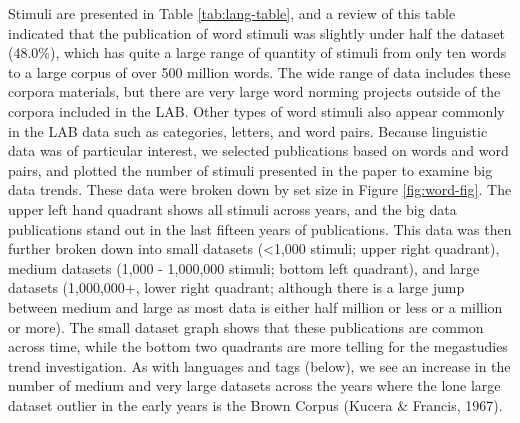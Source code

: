 \documentclass[english,man]{apa6}
\theoremstyle{definition}
\theoremstyle{definition}
\theoremstyle{definition}
\theoremstyle{remark}
\begin{document}
Stimuli are presented in Table \ref{tab:lang-table}, and a review of
this table indicated that the publication of word stimuli was slightly
under half the dataset (48.0\%), which has quite a large range of
quantity of stimuli from only ten words to a large corpus of over 500
million words. The wide range of data includes these corpora materials,
but there are very large word norming projects outside of the corpora
included in the LAB. Other types of word stimuli also appear commonly in
the LAB data such as categories, letters, and word pairs. Because
linguistic data was of particular interest, we selected publications
based on words and word pairs, and plotted the number of stimuli
presented in the paper to examine big data trends. These data were
broken down by set size in Figure \ref{fig:word-fig}. The upper left
hand quadrant shows all stimuli across years, and the big data
publications stand out in the last fifteen years of publications. This
data was then further broken down into small datasets (\textless{}1,000
stimuli; upper right quadrant), medium datasets (1,000 - 1,000,000
stimuli; bottom left quadrant), and large datasets (1,000,000+, lower
right quadrant; although there is a large jump between medium and large
as most data is either half million or less or a million or more). The
small dataset graph shows that these publications are common across
time, while the bottom two quadrants are more telling for the
megastudies trend investigation. As with languages and tags (below), we
see an increase in the number of medium and very large datasets across
the years where the lone large dataset outlier in the early years is the
Brown Corpus (Kucera \& Francis, 1967).
\end{document}
